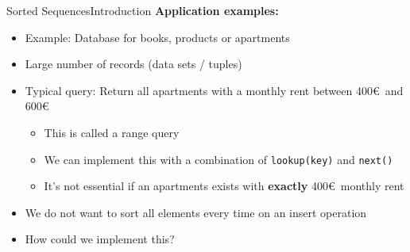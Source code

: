 \begin{frame}{Sorted Sequences}{Introduction}
  \textbf{Application examples:}
  \begin{itemize}
    \item<2->
      Example: Database for books, products or apartments
    \item<3->
      Large number of records (data sets / tuples)
    \item<4->
      Typical query: Return all apartments with a monthly rent between
      400\euro\, and 600\euro
      \begin{itemize}
        \item<5->
          This is called a {\color{Mittel-Blau}range query}
        \item<6->
          We can implement this with a combination of
          {\color{Mittel-Blau}\texttt{lookup(key)}} and
          {\color{Mittel-Blau}\texttt{next()}}
        \item<7->
          It's not essential if an apartments exists with \textbf{exactly}
          400\euro\, monthly rent
      \end{itemize}
    \item<8->
      We do not want to sort all elements every time on an 
      {\color{Mittel-Blau}insert} operation
     \item<9->
      How could we implement this?
  \end{itemize}
\end{frame}


